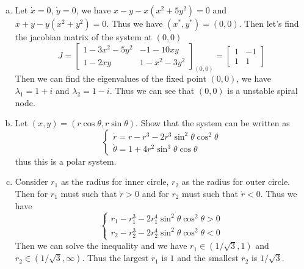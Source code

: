\documentclass[12pt]{exam}
\begin{document}
\begin{enumerate}[(a)]
	\item Let $\dot{x} = 0$, $\dot{y} = 0$, we have $x - y -x(x^2+5y^2) = 0$ and $x +y - y(x^2+y^2) = 0$. Thus we have $(x^*, y^*) = (0, 0)$. Then let's find the jacobian matrix of the system at $(0,0)$
	\[ J = \begin{bmatrix}
		1-3x^2-5y^2 & -1-10xy \\
		1-2xy & 1-x^2-3y^2
	\end{bmatrix}_{(0,0)} = \begin{bmatrix}
		1 & -1 \\
		1 & 1
	\end{bmatrix} \]
	Then we can find the eigenvalues of the fixed point $(0,0)$, we have $\lambda_1 = 1 + i$ and $\lambda_2 = 1 - i$. Thus we can see that $(0,0)$ is a unstable spiral node. 

	\item Let $(x,y) = (r\cos\theta, r\sin\theta)$. Show that the system can be written as
		\[ \begin{cases}
			\dot{r} = r-r^3 -2r^3 \sin^2\theta \cos^2\theta \\
			\dot{\theta} = 1 + 4r^2 \sin^3\theta \cos\theta
		\end{cases} \]
		thus this is a polar system.
		
	\item Consider $r_1$ as the radius for inner circle, $r_2$ as the radius for outer circle. Then for $r_1$ must such that $\dot{r} >0$ and for $r_2$ must such that $\dot{r} < 0$. Thus we have
		\[ \begin{cases}
			r_1 - r_1^3 - 2r_1^4 \sin^2\theta \cos^2\theta > 0 \\
			r_2 - r_2^3 - 2r_2^4 \sin^2\theta \cos^2\theta < 0
		\end{cases} \]
		Then we can solve the inequality and we have $r_1 \in (1/\sqrt{3}, 1)$ and $r_2 \in (1/\sqrt{3}, \infty)$. Thus the largest $r_1$ is $1$ and the smallest $r_2$ is $1/\sqrt{3}$.
\end{enumerate}
\end{document}
